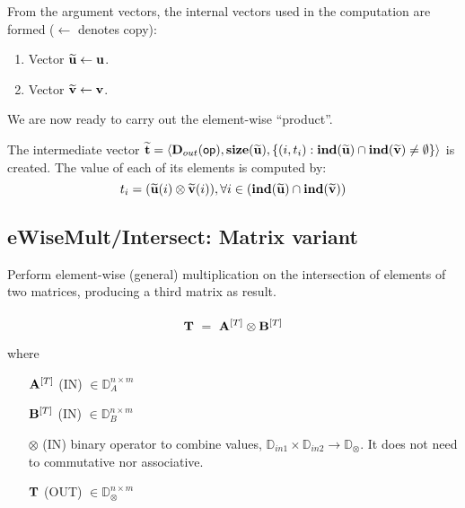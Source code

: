 From the argument vectors, the internal vectors used in 
the computation are formed ($\leftarrow$ denotes copy):
\begin{enumerate}
	\item Vector ${\bf \widetilde{u}} \leftarrow {\bf u}$.

	\item Vector ${\bf \widetilde{v}} \leftarrow {\bf v}$.
\end{enumerate}

We are now ready to carry out the element-wise ``product''.

The intermediate vector ${\bf \widetilde{t}} = \langle
\mbox{$\mathbf{D}_{out}$}({\sf op}), \bold{size}({\bf \widetilde{u}}),
\{(i,t_i) : \bold{ind}({\bf \widetilde{u}}) \cap 
\bold{ind}({\bf \widetilde{v}})
 \neq \emptyset \} \rangle$
is created.  The value of each of its elements is computed by:
\[t_i = ({\bf \widetilde{u}}(i)
\otimes {\bf \widetilde{v}}(i)), \forall i \in 
(\bold{ind}({\bf \widetilde{u}}) \cap 
\bold{ind}({\bf \widetilde{v}}))\]


\subsection{{\sf eWiseMult/Intersect}: Matrix variant}

Perform element-wise (general) multiplication on the intersection of elements 
of two matrices, producing a third matrix as result.

\paragraph{\syntax}


$$
{\bf T} ~ = ~ {\bf A}^{[T]} \otimes {\bf B}^{[T]}
$$

where

\begin{itemize}[leftmargin=1.1in]
    \item[${\bf A}^{[T]}$]    ({\sf IN}) $\in \mathbb{D}_{A}^{n\times m}$

    \item[${\bf B}^{[T]}$]    ({\sf IN}) $\in \mathbb{D}_{B}^{n\times m}$

    \item[$\otimes$]   ({\sf IN}) binary operator to combine values, $\mathbb{D}_{in1} \times \mathbb{D}_{in2} \rightarrow \mathbb{D}_\otimes$.  It does not need to commutative nor associative.

    \item[${\bf T}$]    ({\sf OUT}) $\in \mathbb{D}_\otimes^{n\times m}$
\end{itemize}


